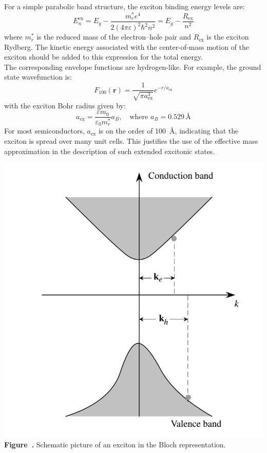 For a simple parabolic band structure, the exciton binding energy levels are:
\begin{equation}
	E^{\text{ex}}_n = E_g - \frac{m_r^*e^4}{2(4\pi \varepsilon)^2 \hbar^2 n^2} = E_g - \frac{R_{\text{ex}}}{n^2}
\end{equation}
where \( m_r^* \) is the reduced mass of the electron–hole pair and \( R_{\text{ex}} \) is the exciton Rydberg. The kinetic energy associated with the center-of-mass motion of the exciton should be added to this expression for the total energy.\\
The corresponding envelope functions are hydrogen-like. For example, the ground state wavefunction is:
\begin{equation}
	F_{100}(\mathbf{r}) = \frac{1}{\sqrt{\pi a_{\text{ex}}^3}} e^{-r/a_{\text{ex}}}
\end{equation}
with the exciton Bohr radius given by:
\begin{equation}
	a_{\text{ex}} = \frac{\varepsilon m_0}{\varepsilon_0 m_r^*} a_B, \quad \text{where } a_B = 0.529\,\text{\AA}
\end{equation}
For most semiconductors, \( a_{\text{ex}} \) is on the order of 100~\AA, indicating that the exciton is spread over many unit cells. This justifies the use of the effective mass approximation in the description of such extended excitonic states.
\begin{center}
	\begin{minipage}{0.8\textwidth}
		\centering
		\includegraphics[width=\textwidth]{img/Exciton_Block.png}
		\\[0.5em]
		\textbf{Figure~\thefigure.} Schematic picture of an exciton in the Bloch representation.
		\label{fig:Exciton_Block}
	\end{minipage}
\end{center}
